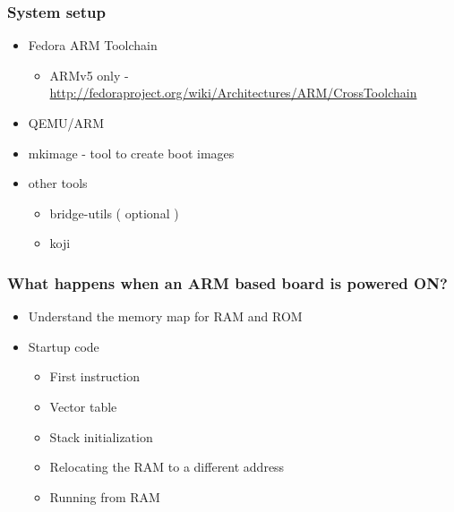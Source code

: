 \documentclass[11pt]{beamer}
\begin{document}
\begin{frame}[fragile]\frametitle{System setup}
\label{sec-4.3}

\begin{itemize}

\item Fedora ARM Toolchain\\
\label{sec-4.3.1}

\begin{itemize}
\item ARMv5 only - \href{http://fedoraproject.org/wiki/Architectures/ARM/CrossToolchain}{http://fedoraproject.org/wiki/Architectures/ARM/CrossToolchain}
\end{itemize}

\item QEMU/ARM\\
\label{sec-4.3.2}


\item mkimage - tool to create boot images\\
\label{sec-4.3.3}


\item other tools\\
\label{sec-4.3.4}

\begin{itemize}
\item bridge-utils ( optional )
\item koji
\end{itemize}
\end{itemize} %
\end{frame}
\begin{frame}[fragile]\frametitle{What happens when an ARM based board is powered ON?}
\label{sec-4.4}

\begin{itemize}

\item Understand the memory map for RAM and ROM\\
\label{sec-4.4.1}


\item Startup code\\
\label{sec-4.4.2}

\begin{itemize}

\item First instruction\\
\label{sec-4.4.2.1}


\item Vector table\\
\label{sec-4.4.2.2}


\item Stack initialization\\
\label{sec-4.4.2.3}


\item Relocating the RAM to a different address\\
\label{sec-4.4.2.4}


\item Running from RAM\\
\label{sec-4.4.2.5}


\end{itemize} %
\end{itemize} %
\end{frame}
\end{document}
